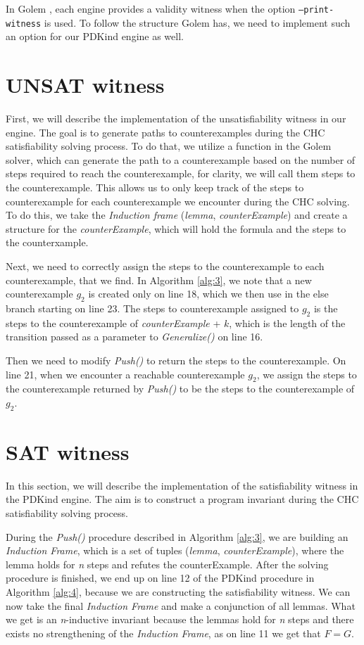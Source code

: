 In Golem \cite{blicha_golem_2023}, each engine provides a validity witness when the option \texttt{--print-witness} is used. To follow the structure Golem has, we need to implement such an option for our PDKind engine as well.

\section*{UNSAT witness}
First, we will describe the implementation of the unsatisfiability witness in our engine. The goal is to generate paths to counterexamples during the CHC satisfiability solving process. To do that, we utilize a function in the Golem solver, which can generate the path to a counterexample based on the number of steps required to reach the counterexample, for clarity, we will call them steps to the counterexample. This allows us to only keep track of the steps to counterexample for each counterexample we encounter during the CHC solving. To do this, we take the \textit{Induction frame} (\textit{lemma}, \textit{counterExample}) and create a structure for the \textit{counterExample}, which will hold the formula and the steps to the counterxample.

Next, we need to correctly assign the steps to the counterexample to each counterexample, that we find. In Algorithm \ref{alg:3}, we note that a new counterexample $g_2$ is created only on line 18, which we then use in the else branch starting on line 23. The steps to counterexample assigned to $g_2$ is the steps to the counterexample of \textit{counterExample} + $k$, which is the length of the transition passed as a parameter to \textit{Generalize()} on line 16.

Then we need to modify \textit{Push()} to return the steps to the counterexample. On line 21, when we encounter a reachable counterexample $g_2$, we assign the steps to the counterexample returned by \textit{Push()} to be the steps to the counterexample of $g_2$.

\section*{SAT witness}
\noindent In this section, we will describe the implementation of the satisfiability witness in the PDKind engine. The aim is to construct a program invariant during the CHC satisfiability solving process.

During the \textit{Push()} procedure described in Algorithm \ref{alg:3}, we are building an \textit{Induction Frame}, which is a set of tuples (\textit{lemma}, \textit{counterExample}), where the lemma holds for \textit{n} steps and refutes the counterExample. After the solving procedure is finished, we end up on line 12 of the PDKind procedure in Algorithm \ref{alg:4}, because we are constructing the satisfiability witness. We can now take the final \textit{Induction Frame} and make a conjunction of all lemmas. What we get is an \textit{n}-inductive invariant because the lemmas hold for \textit{n} steps and there exists no strengthening of the \textit{Induction Frame}, as on line 11 we get that \( F = G \).


